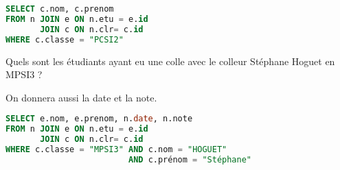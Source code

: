 \begin{Answer}
\begin{lstlisting}[language=SQL]
SELECT c.nom, c.prenom
FROM n JOIN e ON n.etu = e.id
       JOIN c ON n.clr= c.id
WHERE c.classe = "PCSI2"
\end{lstlisting}
\end{Answer}
\begin{Exercise}
Quels sont les étudiants ayant eu une colle avec le colleur Stéphane Hoguet en MPSI3 ? 

On donnera aussi la date et la note.
\end{Exercise}
\begin{Answer}
\begin{lstlisting}[language=SQL]
SELECT e.nom, e.prenom, n.date, n.note
FROM n JOIN e ON n.etu = e.id
       JOIN c ON n.clr= c.id
WHERE c.classe = "MPSI3" AND c.nom = "HOGUET" 
                         AND c.prénom = "Stéphane"
\end{lstlisting}
\newpage
\end{Answer}
